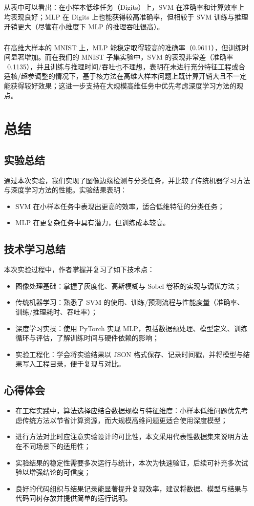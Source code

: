 \paragraph{} 从表中可以看出：在小样本低维任务（Digits）上，SVM 在准确率和计算效率上均表现良好；MLP 在 Digits 上也能获得较高准确率，但相较于 SVM 训练与推理开销更大（尽管在小维度下 MLP 的推理吞吐很高）。

\paragraph{} 在高维大样本的 MNIST 上，MLP 能稳定取得较高的准确率（0.9611），但训练时间显著增加。而在我们的 MNIST 子集实验中，SVM 的表现非常差（准确率 ~0.1135），并且训练与推理时间/吞吐也不理想，表明在未进行充分特征工程或合适核/超参调整的情况下，基于核方法在高维大样本问题上既计算开销大且不一定能获得较好效果；这进一步支持在大规模高维任务中优先考虑深度学习方法的观点。

\chapter{总结}

\section{实验总结}
通过本次实验，我们实现了图像边缘检测与分类任务，并比较了传统机器学习方法与深度学习方法的性能。实验结果表明：
\begin{itemize}
    \item SVM 在小样本任务中表现出更高的效率，适合低维特征的分类任务；
    \item MLP 在更复杂任务中具有潜力，但训练成本较高。
\end{itemize}

\section{技术学习总结}
本次实验过程中，作者掌握并复习了如下技术点：
\begin{itemize}
    \item 图像处理基础：掌握了灰度化、高斯模糊与 Sobel 卷积的实现与调优方法；
    \item 传统机器学习：熟悉了 SVM 的使用、训练/预测流程与性能度量（准确率、训练/推理耗时、吞吐率）；
    \item 深度学习实操：使用 PyTorch 实现 MLP，包括数据预处理、模型定义、训练循环与评估，了解训练时间与硬件依赖的影响；
    \item 实验工程化：学会将实验结果以 JSON 格式保存、记录时间戳，并将模型与结果写入工程目录，便于复现与对比。
\end{itemize}

\section{心得体会}
\begin{itemize}
    \item 在工程实践中，算法选择应结合数据规模与特征维度：小样本低维问题优先考虑传统方法以节省计算资源，而大规模高维问题更适合使用深度模型；
    \item 进行方法对比时应注意实验设计的可比性，本文采用代表性数据集来说明方法在不同场景下的适用性；
    \item 实验结果的稳定性需要多次运行与统计，本次为快速验证，后续可补充多次试验以增强结论的可信度；
    \item 良好的代码组织与结果记录能显著提升复现效率，建议将数据、模型与结果与代码同树存放并提供简单的运行说明。
\end{itemize}
